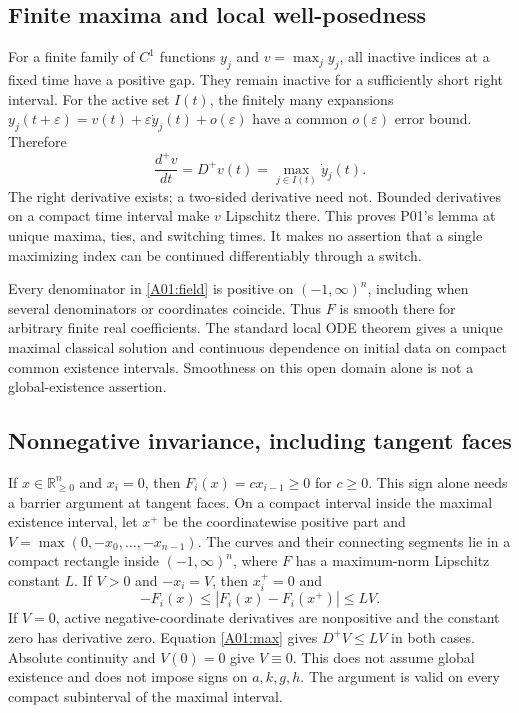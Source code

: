 \documentclass[11pt]{article}
\newcommand{\RR}{\mathbb R}
\newcommand{\Orth}{\RR_{\geq0}^{n}}
\newcommand{\Dom}{(-1,\infty)^n}
\begin{document}
\subsection{Finite maxima and local well-posedness}
For a finite family of $C^1$ functions $y_j$ and $v=\max_j y_j$, all
inactive indices at a fixed time have a positive gap. They remain
inactive for a sufficiently short right interval. For the active set
$I(t)$, the finitely many expansions
$y_j(t+\varepsilon)=v(t)+\varepsilon\dot y_j(t)+o(\varepsilon)$
have a common $o(\varepsilon)$ error bound. Therefore
\begin{equation}\label{A01:max}
 \frac{d^+v}{dt}=D^+v(t)=\max_{j\in I(t)}\dot y_j(t).
\end{equation}
The right derivative exists; a two-sided derivative need not. Bounded
derivatives on a compact time interval make $v$ Lipschitz there.
This proves P01's lemma at unique maxima, ties, and switching times.
It makes no assertion that a single maximizing index can be continued
differentiably through a switch.

Every denominator in \eqref{A01:field} is positive on $\Dom$, including
when several denominators or coordinates coincide. Thus $F$ is smooth
there for arbitrary finite real coefficients. The standard local ODE
theorem gives a unique maximal classical solution and continuous
dependence on initial data on compact common existence intervals.
Smoothness on this open domain alone is not a global-existence assertion.

\subsection{Nonnegative invariance, including tangent faces}
If $x\in\Orth$ and $x_i=0$, then $F_i(x)=c x_{i-1}\geq0$ for $c\geq0$.
This sign alone needs a barrier argument at tangent faces. On a compact
interval inside the maximal existence interval, let $x^+$ be the
coordinatewise positive part and $V=\max(0,-x_0,\ldots,-x_{n-1})$.
The curves and their connecting segments lie in a compact rectangle
inside $\Dom$, where $F$ has a maximum-norm Lipschitz constant $L$.
If $V>0$ and $-x_i=V$, then $x_i^+=0$ and
\[
 -F_i(x)\leq |F_i(x)-F_i(x^+)|\leq LV.
\]
If $V=0$, active negative-coordinate derivatives are nonpositive and
the constant zero has derivative zero. Equation \eqref{A01:max} gives
$D^+V\leq LV$ in both cases. Absolute continuity and $V(0)=0$ give
$V\equiv0$. This does not assume global existence and does not impose
signs on $a,k,g,h$. The argument is valid on every compact subinterval
of the maximal interval.
\end{document}
